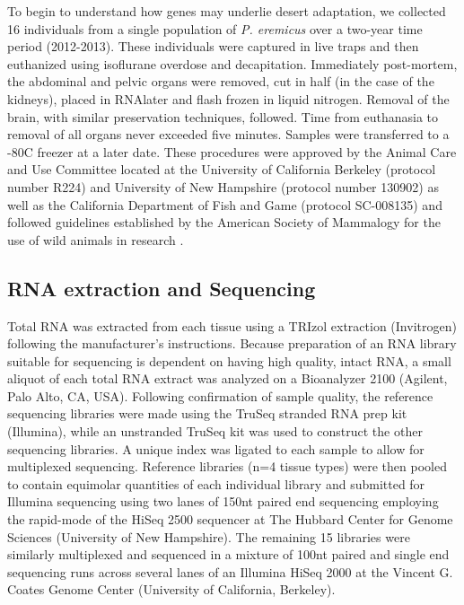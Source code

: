 \documentclass[11pt]{article}
\begin{document}
To begin to understand how genes may underlie desert adaptation, we collected 16 individuals from a single population of \textit{P. eremicus} over a two-year time period (2012-2013). These individuals were captured in live traps and then euthanized using isoflurane overdose and decapitation. Immediately post-mortem, the abdominal and pelvic organs were removed, cut in half (in the case of the kidneys), placed in RNAlater and flash frozen in liquid nitrogen. Removal of the brain, with similar preservation techniques, followed. Time from euthanasia to removal of all organs never exceeded five minutes. Samples were transferred to a -80C freezer at a later date. These procedures were approved by the Animal Care and Use Committee located at the University of California Berkeley (protocol number R224) and University of New Hampshire (protocol number 130902) as well as the California Department of Fish and Game (protocol SC-008135) and followed guidelines established by the American Society of Mammalogy for the use of wild animals in research \cite{Sikes:2011dz}.  

\subsection*{RNA extraction and Sequencing}

Total RNA was extracted from each tissue using a TRIzol extraction (Invitrogen) following the manufacturer's instructions. Because preparation of an RNA library suitable for sequencing is dependent on having high
quality, intact RNA, a small aliquot of each total RNA extract was
analyzed on a Bioanalyzer 2100 (Agilent, Palo Alto, CA, USA).
Following confirmation of sample quality, the reference sequencing libraries
were made using the TruSeq stranded RNA prep kit
(Illumina), while an unstranded TruSeq kit was used to construct the other sequencing libraries. A unique index was ligated to each sample to allow for multiplexed sequencing. Reference libraries (n=4 tissue types) were then pooled to
contain equimolar quantities of each individual library and
submitted for Illumina sequencing using two lanes of 150nt paired end sequencing employing the rapid-mode of the HiSeq 2500 sequencer at The Hubbard Center for Genome Sciences (University of New Hampshire). The remaining 15 libraries were similarly multiplexed and sequenced in a mixture of 100nt paired and single end sequencing runs across several lanes of an Illumina HiSeq 2000 at the Vincent G. Coates Genome Center (University of California, Berkeley).
\end{document}
